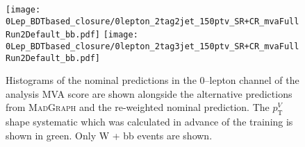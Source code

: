 \begin{figure}[ht!]
  \centering
  \texttt{[image: 0Lep\_BDTbased\_closure/0lepton\_2tag2jet\_150ptv\_SR+CR\_mvaFullRun2Default\_bb.pdf]}
  \texttt{[image: 0Lep\_BDTbased\_closure/0lepton\_2tag3jet\_150ptv\_SR+CR\_mvaFullRun2Default\_bb.pdf]}
  \\
  \caption[Nominal, alternative and re-weighted nominal predictions of $W+$jets
  events (0--lepton channel, MVA score).]{Histograms
    of the nominal predictions in the 0--lepton channel of the analysis MVA
    score are shown alongside the alternative predictions from \textsc{MadGraph}
    and the re-weighted nominal prediction. The $p_{\mathrm{T}}^V$ shape systematic which
    was calculated in advance of the training is shown in green. Only W + bb
    events are shown.}
  \label{fig:wjets_0lep_FullRun2MVA_BDTrClosure}
\end{figure}